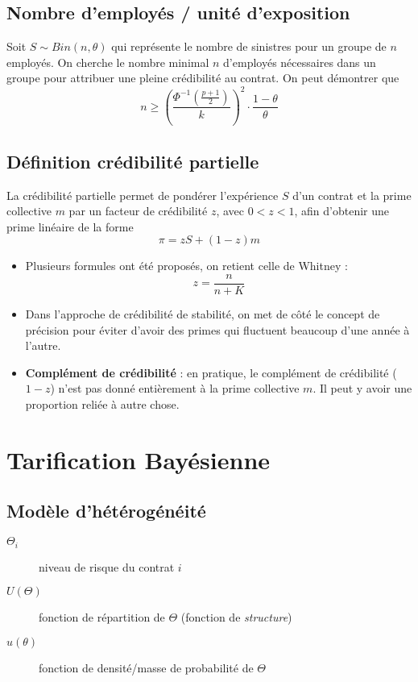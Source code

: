 \documentclass[10pt, french]{article}
\begin{document}
\begin{multicols*}{3}
\subsection*{Nombre d'employés / unité d'exposition}
Soit $S \sim Bin(n, \theta)$ qui représente le nombre de sinistres pour un groupe de $n$ employés. On cherche le nombre minimal $n$ d'employés nécessaires dans un groupe pour attribuer une pleine crédibilité au contrat. On peut démontrer que
\begin{equation}
n \geq \left( \frac{\Phi^{-1}\left(\frac{p+1}{2} \right)}{k} \right)^2 \cdot \frac{1 - \theta}{\theta}
\end{equation}

\subsection*{Définition crédibilité partielle}
\begin{definition}
La crédibilité partielle permet de pondérer l'expérience $S$ d'un contrat et la prime collective $m$ par un facteur de crédibilité $z$, avec $0 < z < 1$, afin d'obtenir une prime linéaire de la forme
\[\pi = z S + (1-z) m\]
\end{definition}
\begin{itemize}
\item Plusieurs formules ont été proposés, on retient celle de Whitney :
\begin{equation}
z = \frac{n}{n+K}
\end{equation}
\item Dans l'approche de crédibilité de stabilité, on met de côté le concept de précision pour éviter d'avoir des primes qui fluctuent beaucoup d'une année à l'autre.
\item \textbf{Complément de crédibilité} : en pratique, le complément de crédibilité ($1-z$) n'est pas donné entièrement à la prime collective $m$. Il peut y avoir une proportion reliée à autre chose.
\end{itemize}

\newpage

\section{Tarification Bayésienne}
\subsection*{Modèle d'hétérogénéité}
\begin{description}
\item[$\Theta_i$] niveau de risque du contrat $i$
\item[$U(\Theta)$] fonction de répartition de $\Theta$ (fonction de \emph{structure})
\item[$u(\theta)$] fonction de densité/masse de probabilité de $\Theta$
\end{description}

\end{multicols*}
\end{document}
